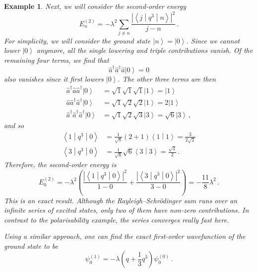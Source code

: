 \documentclass{article}
\theoremstyle{plain}\theoremheaderfont{\normalfont\itshape}\theorembodyfont{\rmfamily}\theoremseparator{.}\newtheorem*{rem}{Remark}\newtheorem*{ex}{Example}\newtheorem*{proof}{Proof}\newtheorem*{altp}{Alternative proof}
\theoremstyle{plain}\theoremheaderfont{\normalfont\bfseries}\theorembodyfont{\rmfamily}\theoremseparator{.}\newtheorem{thm}{Theorem}[section]\newtheorem{lem}[thm]{Lemma}\newtheorem{prop}[thm]{Proposition}\newtheorem*{cor}{Corollary}\newtheorem{defn}[thm]{Definition}\newtheorem{clm}[thm]{Claim}\newtheorem{clminproof}{Claim}
\theoremstyle{break}\theoremheaderfont{\normalfont\itshape}\theorembodyfont{\rmfamily}\theoremseparator{.\medskip}\newtheorem*{proofskip}{Proof}\newtheorem*{exs}{Examples}\newtheorem*{rems}{Remarks}
\theoremstyle{break}\theoremheaderfont{\normalfont\bfseries}\theorembodyfont{\rmfamily}\theoremseparator{.\medskip}\newtheorem{lemskip}[thm]{Lemma}\newtheorem{defnskip}[thm]{Definition}\newtheorem{propskip}[thm]{Proposition}\newtheorem{thmskip}[thm]{Theorem}
\numberwithin{equation}{section}
\newcommand{\ket}[1]{\left| #1 \right\rangle}
\newcommand{\braket}[2]{\left\langle #1 \middle| #2 \right\rangle}
\newcommand{\mel}[3]{\left\langle #1 \middle| #2 \middle| #3 \right\rangle}
\newcommand{\abs}[1]{\left| #1 \right|}
\begin{document}
\begin{ex}
        Next, we will consider the second-order energy
        \begin{equation}
            E_n^{(2)}=-\lambda^2\sum_{j\ne n}\frac{\abs{\mel{j}{q^3}{n}}^2}{j-n}\,.
        \end{equation}
        For simplicity, we will consider the ground state \(\ket{n}=\ket{0}\). Since we cannot lower \(\ket{0}\) anymore, all the single lowering and triple contributions vanish. Of the remaining four terms, we find that
        \begin{equation}
            \hat{a}^\dagger\hat{a}^\dagger\hat{a}\ket{0}=0
        \end{equation}
        also vanishes since it first lowers \(\ket{0}\). The other three terms are then
        \begin{align}
            \hat{a}^\dagger\hat{a}\hat{a}^\dagger\ket{0}&=\sqrt{1}\sqrt{1}\sqrt{1}\ket{1}=\ket{1}\\
            \hat{a}\hat{a}^\dagger\hat{a}^\dagger\ket{0}&=\sqrt{1}\sqrt{2}\sqrt{2}\ket{1}=2\ket{1}\\
            \hat{a}^\dagger\hat{a}^\dagger\hat{a}^\dagger\ket{0}&=\sqrt{1}\sqrt{2}\sqrt{3}\ket{3}=\sqrt{6}\ket{3}\,,
        \end{align}
        and so
        \begin{align}
            \mel{1}{q^3}{0}&=\frac{1}{\sqrt{8}}(2+1)\braket{1}{1}=\frac{3}{2\sqrt{2}}\\
            \mel{3}{q^3}{0}&=\frac{1}{\sqrt{8}}\sqrt{6}\braket{3}{3}=\frac{\sqrt{3}}{2}\,.
        \end{align}
        Therefore, the second-order energy is
        \begin{equation}
            E_0^{(2)}=-\lambda^2\left(\frac{\abs{\mel{1}{q^3}{0}}^2}{1-0}+\frac{\abs{\mel{3}{q^3}{0}}^2}{3-0}\right)=-\frac{11}{8}\lambda^2\,.
        \end{equation}
        This is an exact result. Although the Rayleigh--Schr\"{o}dinger sum runs over an infinite series of excited states, only two of them have non-zero contributions. In contrast to the polarisability example, the series converges really fast here.

        Using a similar approach, one can find the exact first-order wavefunction of the ground state to be
        \begin{equation}
            \psi_0^{(1)}=-\lambda\left(q+\frac{1}{3}q^3\right)\psi_0^{(0)}\,.
        \end{equation}
        
    \end{ex}
\end{document}
